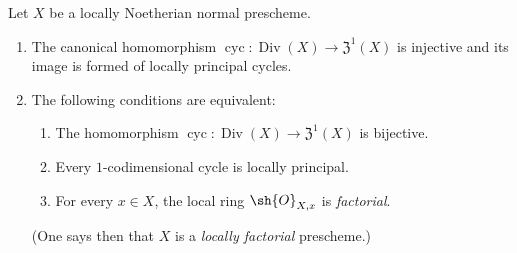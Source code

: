 \begin{theorem}[21.6.9]
\label{IV.21.6.9}
Let $X$ be a locally Noetherian normal prescheme.
\begin{enumerate}[label=\emph{(\roman*)}]
  \item The canonical homomorphism $\operatorname{cyc}:\operatorname{Div}(X)\to\mathfrak{Z}^1(X)$ is injective and its image is formed of locally principal cycles.
  \item The following conditions are equivalent:
  \begin{enumerate}[label=\emph{\alph*)}]
    \item The homomorphism $\operatorname{cyc}:\operatorname{Div}(X)\to\mathfrak{Z}^1(X)$ is bijective.
    \item Every $1$-codimensional cycle is locally principal.
    \item For every $x\in X$, the local ring $\sh{O}_{X,x}$ is \emph{factorial}.
  \end{enumerate}
  (One says then that $X$ is a \emph{locally factorial} prescheme.)
\end{enumerate}
\end{theorem}

